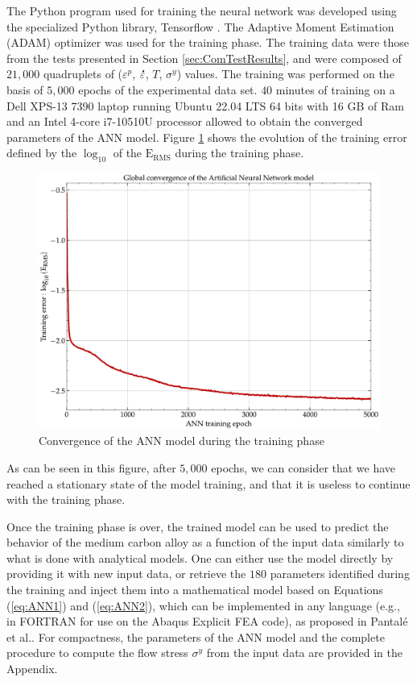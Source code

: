 \documentclass[metals,article,submit,pdftex,moreauthors]{Definitions/mdpi}
\makeatletter
\DeclareRobustCommand{\mdot}[1]{\accentset{\mbox{\bfseries .}}{#1}}
\DeclareRobustCommand{\eal}{et al.\@\xspace}
\DeclareRobustCommand{\eg}{e.g.,\@\xspace}
\DeclareRobustCommand{\RMSE}{\text{E}_\text{RMS}}
\makeatother
\begin{document}
The Python program used for training the neural network was developed using the specialized Python library, Tensorflow \cite{Abadi-2016}.
The Adaptive Moment Estimation (ADAM) optimizer \cite{Kingma-2015} was used for the training phase.
The training data were those from the tests presented in Section \ref{sec:ComTestResults}, and were composed of $21,000$ quadruplets of ($\varepsilon^p$, $\mdot\varepsilon$, $T$, $\sigma^y$) values.
The training was performed on the basis of $5,000$ epochs of the experimental data set.
$40$ minutes of training on a Dell XPS-13 7390 laptop running Ubuntu 22.04 LTS 64 bits with 16 GB of Ram and an Intel 4-core i7-10510U processor allowed to obtain the converged parameters of the ANN model.
Figure \ref{fig:ANN-6-conv} shows the evolution of the training error defined by the $\log_{10}$ of the $\RMSE$ during the training phase.
\begin{figure}[!ht]
\centering
\includegraphics[width=0.7\columnwidth]
{Figures/Conv-ANN-6}
\caption{Convergence of the ANN model during the training phase}
\label{fig:ANN-6-conv}
\end{figure}
As can be seen in this figure, after $5,000$ epochs, we can consider that we have reached a stationary state of the model training, and that it is useless to continue with the training phase.

Once the training phase is over, the trained model can be used to predict the behavior of the medium carbon alloy as a function of the input data similarly to what is done with analytical models.
One can either use the model directly by providing it with new input data, or retrieve the $180$ parameters identified during the training and inject them into a mathematical model based on Equations (\ref{eq:ANN1}) and (\ref{eq:ANN2}), which can be implemented in any language (\eg in FORTRAN for use on the Abaqus Explicit FEA code), as proposed in Pantalé \eal \cite{Pantale-2021, Pantale-2023}.
For compactness, the parameters of the ANN model and the complete procedure to compute the flow stress $\sigma^y$ from the input data are provided in the Appendix.
\end{document}

